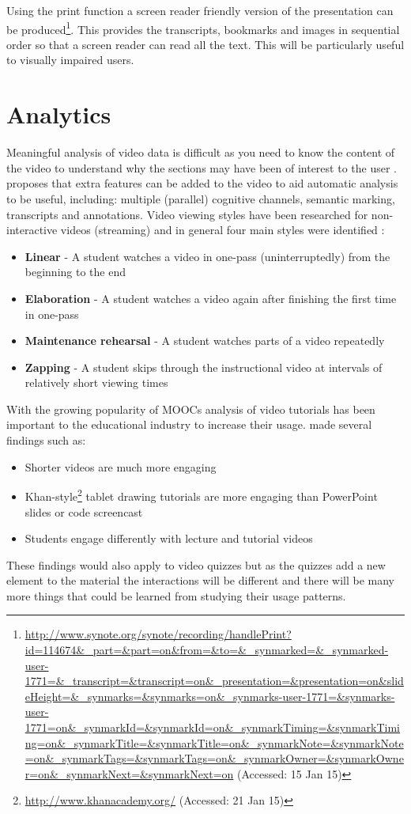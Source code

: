 Using the print function a screen reader friendly version of the presentation can be produced\footnote{\url{http://www.synote.org/synote/recording/handlePrint?id=114674&_part=&part=on&from=&to=&_synmarked=&_synmarked-user-1771=&_transcript=&transcript=on&_presentation=&presentation=on&slideHeight=&_synmarks=&synmarks=on&_synmarks-user-1771=&synmarks-user-1771=on&_synmarkId=&synmarkId=on&_synmarkTiming=&synmarkTiming=on&_synmarkTitle=&synmarkTitle=on&_synmarkNote=&synmarkNote=on&_synmarkTags=&synmarkTags=on&_synmarkOwner=&synmarkOwner=on&_synmarkNext=&synmarkNext=on} (Accessed: 15 Jan 15)}. This provides the transcripts, bookmarks and images in sequential order so that a screen reader can read all the text. This will be particularly useful to visually impaired users.

\section{Analytics}
\label{Section:Analytics}
Meaningful analysis of video data is difficult as you need to know the content of the video to understand why the sections may have been of interest to the user \citep{videoLectures}.  \citep{videoLectures} proposes that extra features can be added to the video to aid automatic analysis to be useful, including: multiple (parallel) cognitive channels, semantic marking, transcripts and annotations. Video viewing styles have been researched for non-interactive videos (streaming) and in general four main styles were identified \citep{DeBoer}:
\begin{itemize}
\item \textbf{Linear} - A student watches a video in one-pass (uninterruptedly) from the beginning to the end
\item \textbf{Elaboration} - A student watches a video again after finishing the first time in one-pass
\item \textbf{Maintenance rehearsal} - A student watches parts of a video repeatedly
\item \textbf{Zapping} - A student skips through the instructional video at intervals of relatively short viewing times
\end{itemize}

With the growing popularity of \glspl{MOOC} analysis of video tutorials has been important to the educational industry to increase their usage.  \citep{engagement} made several findings such as:
\begin{itemize}
\item Shorter videos are much more engaging
\item Khan-style\footnote{\url{http://www.khanacademy.org/} (Accessed: 21 Jan 15)} tablet drawing tutorials are more engaging than PowerPoint slides or code screencast
\item Students engage differently with lecture and tutorial videos
\end{itemize}
These findings would also apply to video quizzes but as the quizzes add a new element to the material the interactions will be different and there will be many more things that could be learned from studying their usage patterns.

